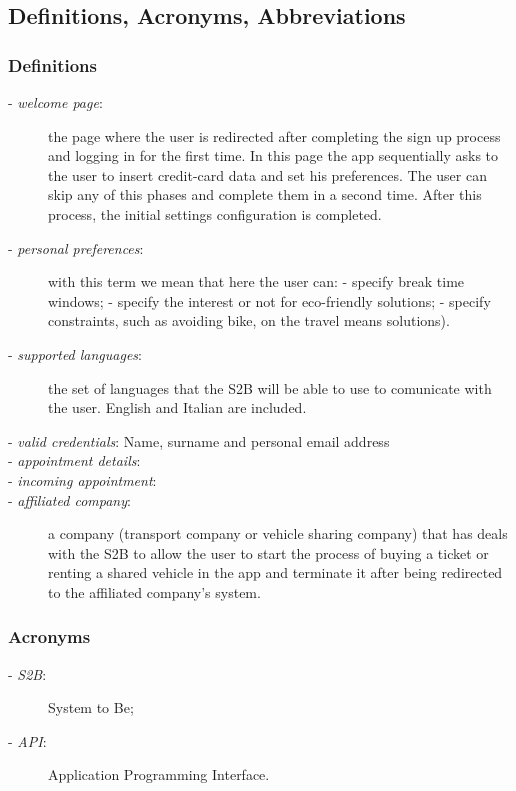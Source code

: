 \subsection{Definitions, Acronyms, Abbreviations}
	\subsubsection{Definitions}
		\begin{description}
			\item[- \textit{welcome page}:] the page where the user is redirected after completing the sign up process and logging in for the first time. In this page the app sequentially  asks to the user to insert credit-card data and set his preferences. The user can skip any of this phases and complete them in a second time. After this process, the initial settings configuration is completed.
			\item[- \textit{personal preferences}:] with this term we mean that here the user can:\newline
			- specify break time windows; \newline
			- specify the interest or not for eco-friendly solutions;\newline
			- specify constraints, such as avoiding  bike, on the travel means solutions).
			\item[- \textit{supported languages}:] the set of languages that the S2B will be able to use to comunicate with the user. English and Italian are included.
			\item[- \textit{valid credentials}: Name, surname and personal email address]
			\item[- \textit{appointment details}:]
			\item[- \textit{incoming appointment}:]
			\item[- \textit{affiliated company}:] a company (transport company or vehicle sharing company) that has deals with the S2B to allow the user to start the process of buying a ticket or renting a shared vehicle in the app and terminate it after being redirected to the affiliated company's system.
		\end{description}
	\subsubsection{Acronyms}
		\begin{description}
		\item[- \textit{S2B}:] System to Be;
		\item[- \textit{API}:] Application Programming Interface.
	\end{description}
